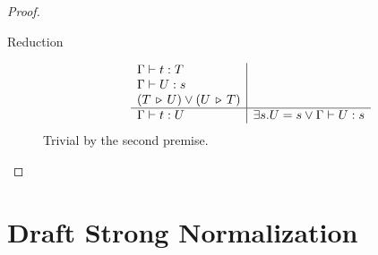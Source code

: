 \documentclass[12pt]{article}
\begin{document}
\begin{theorem}
\begin{proof}
\begin{description}
    \item[Reduction]
      $$
      \begin{array}{l|l}
        \Gamma\vdash t:T \\
        \Gamma\vdash U: s \\
        (T \,\triangleright\, U) \lor (U \,\triangleright\, T) \\
        \hline
        \Gamma\vdash t:U & \exists s. U = s \lor \Gamma\vdash U:s
      \end{array}
      $$
      Trivial by the second premise.
    \end{description}
  \end{proof}
\end{theorem}




\newpage
\section{Draft Strong Normalization}
\end{document}
